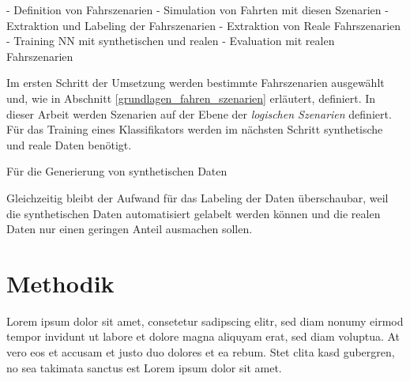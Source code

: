 - Definition von Fahrszenarien
- Simulation von Fahrten mit diesen Szenarien
- Extraktion und Labeling der Fahrszenarien
- Extraktion von Reale Fahrszenarien
- Training NN mit synthetischen und realen
- Evaluation mit realen Fahrszenarien

Im ersten Schritt der Umsetzung werden bestimmte Fahrszenarien ausgewählt und, wie in Abschnitt \ref{grundlagen_fahren_szenarien} erläutert, definiert. In dieser Arbeit werden Szenarien auf der Ebene der \textit{logischen Szenarien} definiert. Für das Training eines Klassifikators werden im nächsten Schritt synthetische und reale Daten benötigt.

Für die Generierung von synthetischen Daten 



Gleichzeitig bleibt der Aufwand für das Labeling der Daten überschaubar, weil die synthetischen Daten automatisiert gelabelt werden können und die realen Daten nur einen geringen Anteil ausmachen sollen.

\section{Methodik}
\label{konzept_methodik}

Lorem ipsum dolor sit amet, consetetur sadipscing elitr, sed diam nonumy eirmod tempor invidunt ut labore et dolore magna aliquyam erat, sed diam voluptua. At vero eos et accusam et justo duo dolores et ea rebum. Stet clita kasd gubergren, no sea takimata sanctus est Lorem ipsum dolor sit amet.  






